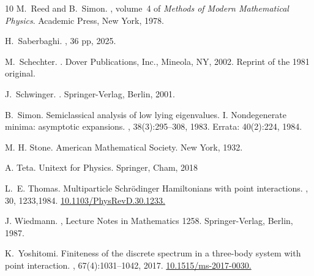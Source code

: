 \documentclass[a4paper,11pt,reqno]{amsart}
\theoremstyle{definition}
\numberwithin{equation}{section}
\begin{document}
\begin{thebibliography}{10}
M.~Reed and B.~Simon.
, volume~4 of {\em Methods of Modern Mathematical Physics}.
\newblock Academic Press, New York, 1978.

H.~Saberbaghi.
, 36 pp,  2025.

M.~Schechter.
.
\newblock Dover Publications, Inc., Mineola, NY, 2002.
\newblock Reprint of the 1981 original.

J.~Schwinger.
.
\newblock Springer-Verlag, Berlin, 2001.

B.~Simon.
\newblock Semiclassical analysis of low lying eigenvalues. {I}. {N}ondegenerate
  minima: asymptotic expansions.
, 38(3):295--308,
  1983. Errata: 40(2):224, 1984. 
  
M. H. Stone.
\newblock American Mathematical Society. New York, 1932.

A. Teta. 
\newblock Unitext for Physics. Springer, Cham, 2018

L.~E. Thomas.
\newblock Multiparticle Schr\"odinger Hamiltonians with point interactions.
, 30, 1233,1984. \href{https://doi.org/10.1103/PhysRevD.30.1233}{10.1103/PhysRevD.30.1233.}

J. Wiedmann. 
, Lecture Notes in Mathematics 1258.
\newblock Springer-Verlag, Berlin, 1987.

K.~Yoshitomi.
\newblock Finiteness of the discrete spectrum in a three-body system with point interaction.
, 67(4):1031--1042, 2017. \href{https://doi.org/10.1515/ms-2017-0030}{10.1515/ms-2017-0030.}

\end{thebibliography}


\end{document}
